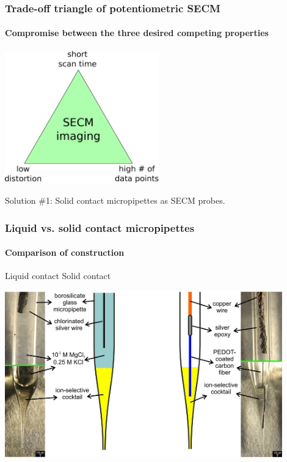\documentclass{beamer}
\begin{document}
\begin{frame}
\frametitle{Trade-off triangle of potentiometric SECM}
\framesubtitle{Compromise between the three desired competing properties}
\begin{center}
\includegraphics[width=0.5\textwidth]{trade-off.eps}
\end{center}
\end{frame}

\begin{frame}[plain]
\centering
Solution \#1:
Solid contact micropipettes as SECM probes.
\end{frame}

\begin{frame}
\frametitle{Liquid vs. solid contact micropipettes}
\framesubtitle{Comparison of construction}
\begin{center}
\quad\quad\quad\quad Liquid contact \hfill Solid contact \quad\quad\quad\quad

\includegraphics[width=0.9\textwidth]{liquid_solid.jpg}
\end{center}
\end{frame}
\end{document}
